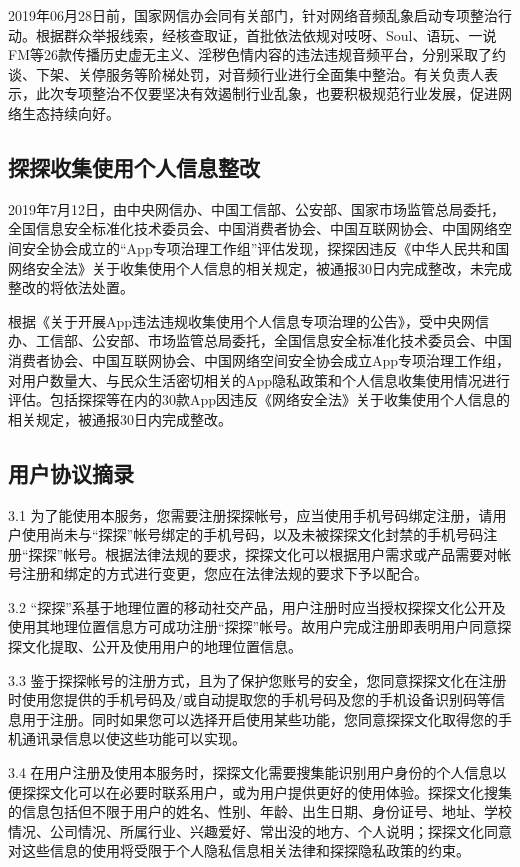 \documentclass[UTF8]{ctexart}
\begin{document}
2019年06月28日前，国家网信办会同有关部门，针对网络音频乱象启动专项整治行动。根据群众举报线索，经核查取证，首批依法依规对吱呀、Soul、语玩、一说FM等26款传播历史虚无主义、淫秽色情内容的违法违规音频平台，分别采取了约谈、下架、关停服务等阶梯处罚，对音频行业进行全面集中整治。有关负责人表示，此次专项整治不仅要坚决有效遏制行业乱象，也要积极规范行业发展，促进网络生态持续向好。\cite{Audio}

\subsection{探探收集使用个人信息整改}

2019年7月12日，由中央网信办、中国工信部、公安部、国家市场监管总局委托，全国信息安全标准化技术委员会、中国消费者协会、中国互联网协会、中国网络空间安全协会成立的“App专项治理工作组”评估发现，探探因违反《中华人民共和国网络安全法》关于收集使用个人信息的相关规定，被通报30日内完成整改，未完成整改的将依法处置。

根据《关于开展App违法违规收集使用个人信息专项治理的公告》，受中央网信办、工信部、公安部、市场监管总局委托，全国信息安全标准化技术委员会、中国消费者协会、中国互联网协会、中国网络空间安全协会成立App专项治理工作组，对用户数量大、与民众生活密切相关的App隐私政策和个人信息收集使用情况进行评估。包括探探等在内的30款App因违反《网络安全法》关于收集使用个人信息的相关规定，被通报30日内完成整改。\cite{Privacy}

\subsection{用户协议摘录}
\begin{tcolorbox}
    3.1 为了能使用本服务，您需要注册探探帐号，应当使用手机号码绑定注册，请用户使用尚未与“探探”帐号绑定的手机号码，以及未被探探文化封禁的手机号码注册“探探”帐号。根据法律法规的要求，探探文化可以根据用户需求或产品需要对帐号注册和绑定的方式进行变更，您应在法律法规的要求下予以配合。

    3.2 “探探”系基于地理位置的移动社交产品，用户注册时应当授权探探文化公开及使用其地理位置信息方可成功注册“探探”帐号。故用户完成注册即表明用户同意探探文化提取、公开及使用用户的地理位置信息。

    3.3 鉴于探探帐号的注册方式，且为了保护您账号的安全，您同意探探文化在注册时使用您提供的手机号码及/或自动提取您的手机号码及您的手机设备识别码等信息用于注册。同时如果您可以选择开启使用某些功能，您同意探探文化取得您的手机通讯录信息以使这些功能可以实现。

    3.4 在用户注册及使用本服务时，探探文化需要搜集能识别用户身份的个人信息以便探探文化可以在必要时联系用户，或为用户提供更好的使用体验。探探文化搜集的信息包括但不限于用户的姓名、性别、年龄、出生日期、身份证号、地址、学校情况、公司情况、所属行业、兴趣爱好、常出没的地方、个人说明；探探文化同意对这些信息的使用将受限于个人隐私信息相关法律和探探隐私政策的约束。\cite{MoMoAgreement}
\end{tcolorbox}
\end{document}
